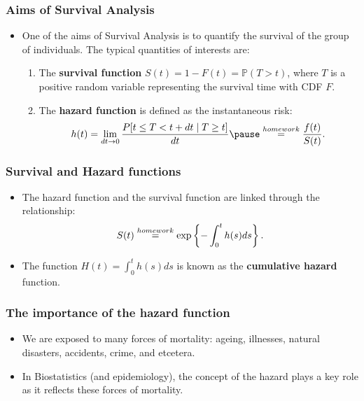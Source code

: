\documentclass[10pt,handout,compress]{beamer}
\newcommand{\pr}{{\mathbb P}}
\begin{document}
\begin{frame}
\frametitle{Aims of Survival Analysis}
\begin{itemize}
\item One of the aims of Survival Analysis is to quantify the survival of the group of individuals. The typical quantities of interests are: \pause
\begin{enumerate}
\item The \textbf{survival function} $S(t) = 1- F(t) = \pr(T>t)$,  where $T$ is a positive random variable representing the survival time with CDF $F$.
\pause
\item The \textbf{hazard function} is defined as the instantaneous risk:
$$h(t) = \lim_{dt \to 0} \dfrac{P[t \leq  T < t+dt \mid  T \geq t]}{dt} \pause \stackrel{\tiny homework}{=} \dfrac{f(t)}{S(t)}.$$ 
\end{enumerate}
\end{itemize}
\end{frame}

\begin{frame}
\frametitle{Survival and Hazard functions}
\begin{itemize}
\item The hazard function and the survival function are linked through the relationship:
$$S(t) \stackrel{\tiny homework}{=} \exp\left\{ - \int_0^t h(s) ds \right\}.$$
\pause
\item The function $H(t) = \int_0^t h(s) ds$ is known as the \textbf{cumulative hazard} function.
\end{itemize}
\end{frame}

\begin{frame}
\frametitle{The importance of the hazard function}
\begin{itemize}
\item We are exposed to many forces of mortality: ageing, illnesses, natural disasters, accidents, crime, and etcetera.  

\pause

\item In Biostatistics (and epidemiology), the concept of the hazard plays a key role as it reflects these forces of mortality.



\end{itemize}
\end{frame}
\end{document}
